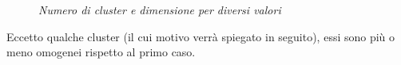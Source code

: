 \begin{figure}[H]
	\centering   
	\caption{\textit{Numero di cluster e dimensione per diversi valori}}
\end{figure}
Eccetto qualche cluster (il cui motivo verrà spiegato in seguito), essi sono più o meno omogenei rispetto al primo caso.

